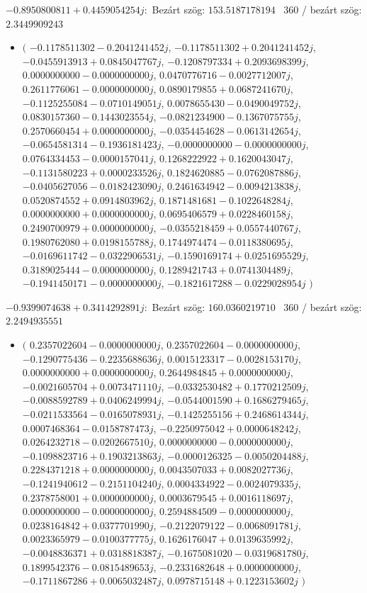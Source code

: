 \documentclass[14pt,a4paper]{article}
\begin{document}
$-0.8950800811+0.4459054254j$:\
Bezárt szög: $153.5187178194$ \
360 / bezárt szög: $2.3449909243$\
\begin{itemize}
\item
$\big($
$-0.1178511302-0.2041241452j$, $-0.1178511302+0.2041241452j$, $-0.0455913913+0.0845047767j$, $-0.1208797334+0.2093698399j$, $0.0000000000-0.0000000000j$, $0.0470776716-0.0027712007j$, $0.2611776061-0.0000000000j$, $0.0890179855+0.0687241670j$, $-0.1125255084-0.0710149051j$, $0.0078655430-0.0490049752j$, $0.0830157360-0.1443023554j$, $-0.0821234900-0.1367075755j$, $0.2570660454+0.0000000000j$, $-0.0354454628-0.0613142654j$, $-0.0654581314-0.1936181423j$, $-0.0000000000-0.0000000000j$, $0.0764334453-0.0000157041j$, $0.1268222922+0.1620043047j$, $-0.1131580223+0.0000233526j$, $0.1824620885-0.0762087886j$, $-0.0405627056-0.0182423090j$, $0.2461634942-0.0094213838j$, $0.0520874552+0.0914803962j$, $0.1871481681-0.1022648284j$, $0.0000000000+0.0000000000j$, $0.0695406579+0.0228460158j$, $0.2490700979+0.0000000000j$, $-0.0355218459+0.0557440767j$, $0.1980762080+0.0198155788j$, $0.1744974474-0.0118380695j$, $-0.0169611742-0.0322906531j$, $-0.1590169174+0.0251695529j$, $0.3189025444-0.0000000000j$, $0.1289421743+0.0741304489j$, $-0.1941450171-0.0000000000j$, $-0.1821617288-0.0229028954j$
$\big)$
\end{itemize}
$-0.9399074638+0.3414292891j$:\
Bezárt szög: $160.0360219710$ \
360 / bezárt szög: $2.2494935551$\
\begin{itemize}
\item
$\big($
$0.2357022604-0.0000000000j$, $0.2357022604-0.0000000000j$, $-0.1290775436-0.2235688636j$, $0.0015123317-0.0028153170j$, $0.0000000000+0.0000000000j$, $0.2644984845+0.0000000000j$, $-0.0021605704+0.0073471110j$, $-0.0332530482+0.1770212509j$, $-0.0088592789+0.0406249994j$, $-0.0544001590+0.1686279465j$, $-0.0211533564-0.0165078931j$, $-0.1425255156+0.2468614344j$, $0.0007468364-0.0158787473j$, $-0.2250975042+0.0000648242j$, $0.0264232718-0.0202667510j$, $0.0000000000-0.0000000000j$, $-0.1098823716+0.1903213863j$, $-0.0000126325-0.0050204488j$, $0.2284371218+0.0000000000j$, $0.0043507033+0.0082027736j$, $-0.1241940612-0.2151104240j$, $0.0004334922-0.0024079335j$, $0.2378758001+0.0000000000j$, $0.0003679545+0.0016118697j$, $0.0000000000-0.0000000000j$, $0.2594884509-0.0000000000j$, $0.0238164842+0.0377701990j$, $-0.2122079122-0.0068091781j$, $0.0023365979-0.0100377775j$, $0.1626176047+0.0139635992j$, $-0.0048836371+0.0318818387j$, $-0.1675081020-0.0319681780j$, $0.1899542376-0.0815489653j$, $-0.2331682648+0.0000000000j$, $-0.1711867286+0.0065032487j$, $0.0978715148+0.1223153602j$
$\big)$
\end{itemize}
\end{document}
